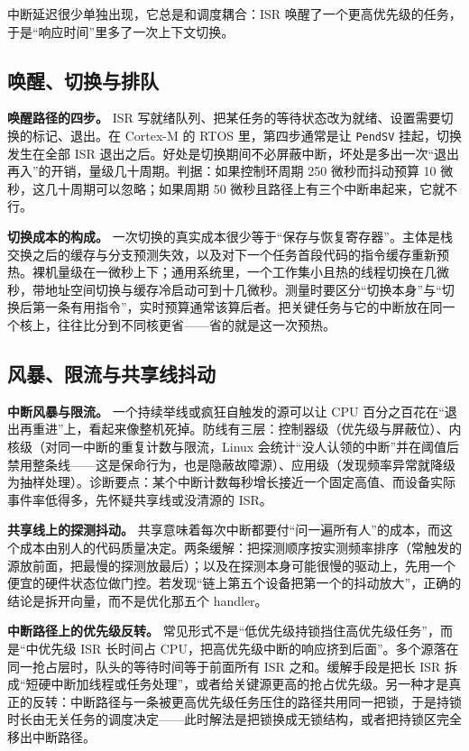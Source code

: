 \documentclass[12pt,a4paper,fontset=fandol]{ctexbook}
\newcommand{\Tp}[1]{\texttt{#1}}
\begin{document}
中断延迟很少单独出现，它总是和调度耦合：ISR 唤醒了一个更高优先级的任务，于是``响应时间''里多了一次上下文切换。

\subsection{唤醒、切换与排队}

\textbf{唤醒路径的四步。} ISR 写就绪队列、把某任务的等待状态改为就绪、设置需要切换的标记、退出。在 Cortex-M 的 RTOS 里，第四步通常是让 \Tp{PendSV} 挂起，切换发生在全部 ISR 退出之后。好处是切换期间不必屏蔽中断，坏处是多出一次``退出再入''的开销，量级几十周期。判据：如果控制环周期 250 微秒而抖动预算 10 微秒，这几十周期可以忽略；如果周期 50 微秒且路径上有三个中断串起来，它就不行。

\textbf{切换成本的构成。} 一次切换的真实成本很少等于``保存与恢复寄存器''。主体是栈交换之后的缓存与分支预测失效，以及对下一个任务首段代码的指令缓存重新预热。裸机量级在一微秒上下；通用系统里，一个工作集小且热的线程切换在几微秒，带地址空间切换与缓存冷启动可到十几微秒。测量时要区分``切换本身''与``切换后第一条有用指令''，实时预算通常该算后者。把关键任务与它的中断放在同一个核上，往往比分到不同核更省——省的就是这一次预热。

\subsection{风暴、限流与共享线抖动}

\textbf{中断风暴与限流。} 一个持续举线或疯狂自触发的源可以让 CPU 百分之百花在``退出再重进''上，看起来像整机死掉。防线有三层：控制器级（优先级与屏蔽位）、内核级（对同一中断的重复计数与限流，Linux 会统计``没人认领的中断''并在阈值后禁用整条线——这是保命行为，也是隐蔽故障源）、应用级（发现频率异常就降级为抽样处理）。诊断要点：某个中断计数每秒增长接近一个固定高值、而设备实际事件率低得多，先怀疑共享线或没清源的 ISR。

\textbf{共享线上的探测抖动。} 共享意味着每次中断都要付``问一遍所有人''的成本，而这个成本由别人的代码质量决定。两条缓解：把探测顺序按实测频率排序（常触发的源放前面，把最慢的探测放最后）；以及在探测本身可能很慢的驱动上，先用一个便宜的硬件状态位做门控。若发现``链上第五个设备把第一个的抖动放大''，正确的结论是拆开向量，而不是优化那五个 handler。

\textbf{中断路径上的优先级反转。} 常见形式不是``低优先级持锁挡住高优先级任务''，而是``中优先级 ISR 长时间占 CPU，把高优先级中断的响应挤到后面''。多个源落在同一抢占层时，队头的等待时间等于前面所有 ISR 之和。缓解手段是把长 ISR 拆成``短硬中断加线程或任务处理''，或者给关键源更高的抢占优先级。另一种才是真正的反转：中断路径与一条被更高优先级任务压住的路径共用同一把锁，于是持锁时长由无关任务的调度决定——此时解法是把锁换成无锁结构，或者把持锁区完全移出中断路径。
\end{document}
